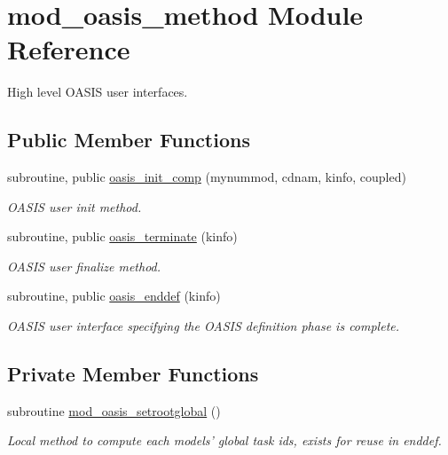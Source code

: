 \hypertarget{classmod__oasis__method}{\section{mod\+\_\+oasis\+\_\+method Module Reference}
\label{classmod__oasis__method}
}


High level O\+A\+S\+I\+S user interfaces.  


\subsection*{Public Member Functions}
\begin{DoxyCompactItemize}
\item 
subroutine, public \hyperlink{classmod__oasis__method_a9d642dd3ca229a1b957bc3c92b33c356}{oasis\+\_\+init\+\_\+comp} (mynummod, cdnam, kinfo, coupled)
\begin{DoxyCompactList}\small\item\em O\+A\+S\+I\+S user init method. \end{DoxyCompactList}\item 
subroutine, public \hyperlink{classmod__oasis__method_a4fb881336906c9452b6a9f250af9c3d7}{oasis\+\_\+terminate} (kinfo)
\begin{DoxyCompactList}\small\item\em O\+A\+S\+I\+S user finalize method. \end{DoxyCompactList}\item 
subroutine, public \hyperlink{classmod__oasis__method_a093552f9f9895ac79a5fefa043fc5881}{oasis\+\_\+enddef} (kinfo)
\begin{DoxyCompactList}\small\item\em O\+A\+S\+I\+S user interface specifying the O\+A\+S\+I\+S definition phase is complete. \end{DoxyCompactList}\end{DoxyCompactItemize}
\subsection*{Private Member Functions}
\begin{DoxyCompactItemize}
\item 
subroutine \hyperlink{classmod__oasis__method_a13d6e469ea14642a2e1e6cb807d9b7de}{mod\+\_\+oasis\+\_\+setrootglobal} ()
\begin{DoxyCompactList}\small\item\em Local method to compute each models' global task ids, exists for reuse in enddef. \end{DoxyCompactList}\end{DoxyCompactItemize}
